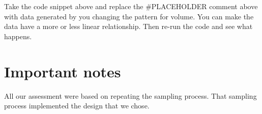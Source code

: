 \documentclass[
  letterpaper,
  DIV=11,
  numbers=noendperiod]{scrartcl}
\begin{document}
Take the code snippet above and replace the \#PLACEHOLDER comment above
with data generated by you changing the pattern for volume. You can make
the data have a more or less linear relationship. Then re-run the code
and see what happens.

\hypertarget{important-notes}{%
\section{\texorpdfstring{\textbf{Important
notes}}{Important notes}}\label{important-notes}}

All our assessment were based on repeating the sampling process. That
sampling process implemented the design that we chose.
\end{document}
